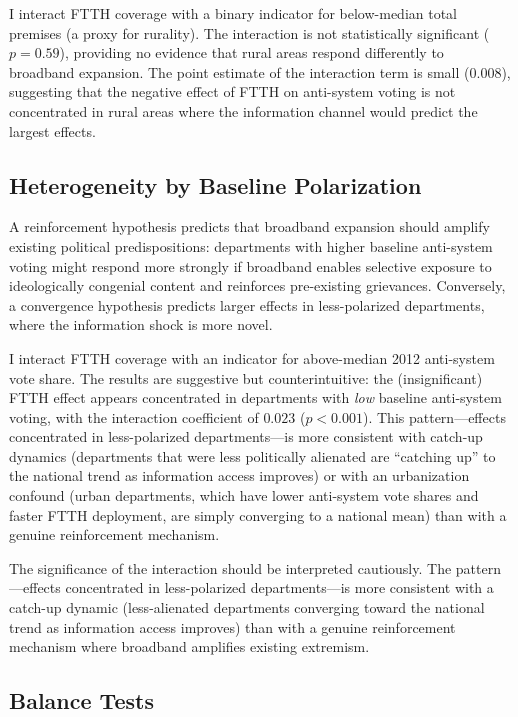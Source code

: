 \documentclass[12pt]{article}
\begin{document}
I interact FTTH coverage with a binary indicator for below-median total premises (a proxy for rurality). The interaction is not statistically significant ($p = 0.59$), providing no evidence that rural areas respond differently to broadband expansion. The point estimate of the interaction term is small ($0.008$), suggesting that the negative effect of FTTH on anti-system voting is not concentrated in rural areas where the information channel would predict the largest effects.

\subsection{Heterogeneity by Baseline Polarization}

A reinforcement hypothesis predicts that broadband expansion should amplify existing political predispositions: departments with higher baseline anti-system voting might respond more strongly if broadband enables selective exposure to ideologically congenial content and reinforces pre-existing grievances. Conversely, a convergence hypothesis predicts larger effects in less-polarized departments, where the information shock is more novel.

I interact FTTH coverage with an indicator for above-median 2012 anti-system vote share. The results are suggestive but counterintuitive: the (insignificant) FTTH effect appears concentrated in departments with \emph{low} baseline anti-system voting, with the interaction coefficient of $0.023$ ($p < 0.001$). This pattern---effects concentrated in less-polarized departments---is more consistent with catch-up dynamics (departments that were less politically alienated are ``catching up'' to the national trend as information access improves) or with an urbanization confound (urban departments, which have lower anti-system vote shares and faster FTTH deployment, are simply converging to a national mean) than with a genuine reinforcement mechanism.

The significance of the interaction should be interpreted cautiously. The pattern---effects concentrated in less-polarized departments---is more consistent with a catch-up dynamic (less-alienated departments converging toward the national trend as information access improves) than with a genuine reinforcement mechanism where broadband amplifies existing extremism.

\subsection{Balance Tests}
\end{document}
